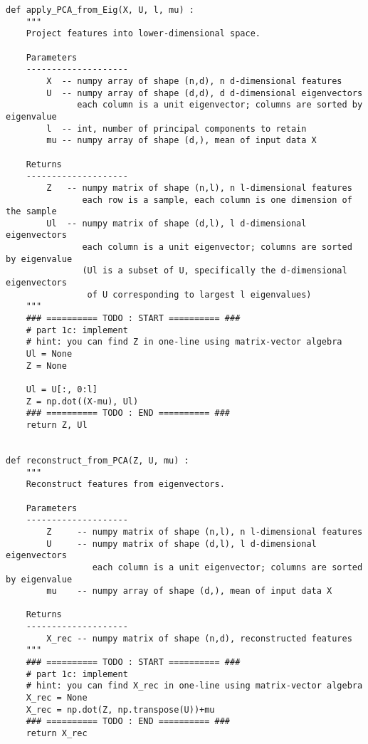 \documentclass[11pt]{article}
\begin{document}
\begin{verbatim}
def apply_PCA_from_Eig(X, U, l, mu) :
    """
    Project features into lower-dimensional space.
    
    Parameters
    --------------------
        X  -- numpy array of shape (n,d), n d-dimensional features
        U  -- numpy array of shape (d,d), d d-dimensional eigenvectors
              each column is a unit eigenvector; columns are sorted by eigenvalue
        l  -- int, number of principal components to retain
        mu -- numpy array of shape (d,), mean of input data X
   
    Returns
    --------------------
        Z   -- numpy matrix of shape (n,l), n l-dimensional features
               each row is a sample, each column is one dimension of the sample
        Ul  -- numpy matrix of shape (d,l), l d-dimensional eigenvectors
               each column is a unit eigenvector; columns are sorted by eigenvalue
               (Ul is a subset of U, specifically the d-dimensional eigenvectors
                of U corresponding to largest l eigenvalues)
    """
    ### ========== TODO : START ========== ###
    # part 1c: implement
    # hint: you can find Z in one-line using matrix-vector algebra
    Ul = None
    Z = None

    Ul = U[:, 0:l]
    Z = np.dot((X-mu), Ul)
    ### ========== TODO : END ========== ###
    return Z, Ul


def reconstruct_from_PCA(Z, U, mu) :
    """
    Reconstruct features from eigenvectors.
    
    Parameters
    --------------------
        Z     -- numpy matrix of shape (n,l), n l-dimensional features
        U     -- numpy matrix of shape (d,l), l d-dimensional eigenvectors
                 each column is a unit eigenvector; columns are sorted by eigenvalue
        mu    -- numpy array of shape (d,), mean of input data X
   
    Returns
    --------------------
        X_rec -- numpy matrix of shape (n,d), reconstructed features
    """
    ### ========== TODO : START ========== ###
    # part 1c: implement
    # hint: you can find X_rec in one-line using matrix-vector algebra
    X_rec = None
    X_rec = np.dot(Z, np.transpose(U))+mu
    ### ========== TODO : END ========== ###
    return X_rec
\end{verbatim}   
 
\end{document}
